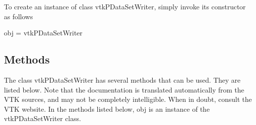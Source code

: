 To create an instance of class vtk\-P\-Data\-Set\-Writer, simply invoke its constructor as follows \begin{DoxyVerb}  obj = vtkPDataSetWriter
\end{DoxyVerb}
 \hypertarget{vtkwidgets_vtkxyplotwidget_Methods}{}\subsection{Methods}\label{vtkwidgets_vtkxyplotwidget_Methods}
The class vtk\-P\-Data\-Set\-Writer has several methods that can be used. They are listed below. Note that the documentation is translated automatically from the V\-T\-K sources, and may not be completely intelligible. When in doubt, consult the V\-T\-K website. In the methods listed below, {\ttfamily obj} is an instance of the vtk\-P\-Data\-Set\-Writer class. 
